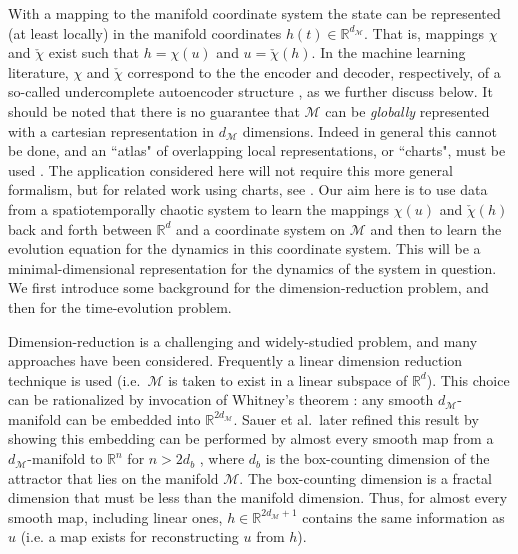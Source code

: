 \documentclass[preprint,aps,pre,letterpaper,onecolumn,superscriptaddress]{revtex4-2} %
\newcommand{\MDG}[1]{\textcolor{magenta}{*** #1 ***}}
\newcommand{\AL}[1]{\textcolor{ao(english)}{*** #1 ***}}
\newcommand{\IM}{\mathcal{M}}
\newcommand{\reals}{\mathbb{R}} %
\begin{document}
With a mapping to the manifold coordinate system the state can be represented (at least locally) in the manifold coordinates $h(t)\in\mathbb{R}^{d_\IM}$. That is, mappings $\chi$ and $\check{\chi}$ exist such that  $h=\chi(u)$ and $u=\check{\chi}(h)$. 
In the machine learning literature, $\chi$ and $\check{\chi}$ correspond to the the encoder and decoder, respectively, of a so-called undercomplete autoencoder structure \cite{Linot2020}, as we further discuss below. It should be noted that  there is no guarantee that $\IM$ can be \emph{globally} represented with a cartesian representation in $d_\IM$ dimensions. Indeed in general this cannot be done, and an ``atlas" of overlapping local representations, or ``charts", must be used \cite{lee2003}.  The application considered here will not require this more general formalism, but for related work using charts, see \cite{floryan2021charts}. Our aim here is to use data from a spatiotemporally chaotic system to learn the mappings  $\chi(u)$ and $\check{\chi}(h)$ back and forth between $\reals^d$ and a coordinate system on $\IM$ and then to learn the evolution equation for the dynamics in this coordinate system. This will be a minimal-dimensional representation for the dynamics of the system in question. We first introduce some background for the dimension-reduction problem, and then for the time-evolution problem. 

Dimension-reduction is a challenging and widely-studied problem, and many approaches have been considered.  Frequently a linear dimension reduction technique is used (i.e.\ $\IM$ is taken to exist in a linear subspace of $\mathbb{R}^d$). This choice can be rationalized by invocation of Whitney's theorem \cite{Whitney1944}: any smooth $d_\IM$-manifold can be embedded into $\mathbb{R}^{2d_\IM}$.  Sauer et al.\ later refined this result by showing this embedding can be performed by almost every smooth map from a $d_\IM$-manifold to $\mathbb{R}^{n}$ for $n>2d_b$ \cite{Sauer1991}, where $d_b$ is the box-counting dimension of the attractor that lies on the manifold $\IM$. The box-counting dimension is a fractal dimension that must be less than the manifold dimension.
	Thus, for almost every smooth map, including linear ones, $h \in \mathbb{R}^{2d_\mathcal{M}+1}$ contains the same information as $u$ (i.e. a map exists for reconstructing $u$ from $h$). 
\end{document}

